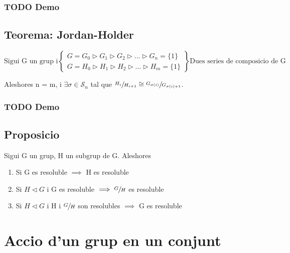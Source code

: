 \documentclass[11pt]{article}
\begin{document}
\subsubsection{{\bfseries\sffamily TODO} Demo}
\label{sec:org172a711}

\subsection{Teorema: Jordan-Holder}
\label{sec:org538576e}
\begin{displaymath}
    \text{Sigui G un grup i}
               \left\{\begin{array}{ll}
G = G_0 \vartriangleright G_1 \vartriangleright G_2 \vartriangleright \ldots \vartriangleright G_n = \{1\} \\
G = H_0 \vartriangleright H_1 \vartriangleright H_2 \vartriangleright \ldots \vartriangleright H_m = \{1\}
                \end{array}
\right\rbrace
              \text{Dues series de composicio de G}
\end{displaymath}

Aleshores n = m, i \(\exists \sigma \in \mathcal{S}_n\) tal que \(\sfrac{H_i}{H_{i+1}} \cong \sfrac{G_{\sigma(i)}}{G_{\sigma(i)+1}}\).

\subsubsection{{\bfseries\sffamily TODO} Demo}
\label{sec:orgdac773a}

\subsection{Proposicio}
\label{sec:org8c27c84}
Sigui G un grup, H un subgrup de G. Aleshores
\begin{enumerate}
\item Si G es resoluble \(\implies\) H es resoluble
\item Si \(H \vartriangleleft G\) i G es resoluble \(\implies \sfrac{G}{H}\) es resoluble
\item Si \(H \vartriangleleft G\) i H i \(\sfrac{G}{H}\) son resolubles \(\implies\) G es resoluble
\end{enumerate}

\section{Accio d'un grup en un conjunt}
\label{sec:orgd0ed7f2}
\end{document}
